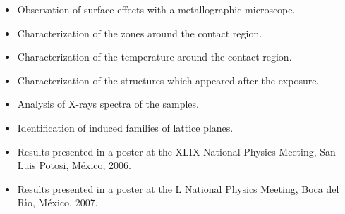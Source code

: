{\begin{itemize}
\begin{itemize}
    \item Observation of surface effects with a metallographic microscope.
    \item Characterization of the zones around the contact region.
    \item Characterization of the temperature around the contact region.
    \item Characterization of the structures which appeared after the exposure.
    \item Analysis of X-rays spectra of the samples.
    \item Identification of induced families of lattice planes.
    \item Results presented in a poster at the XLIX National Physics Meeting, San Luis Potosi, M\'{e}xico, 2006.
    \item Results presented in a poster at the L National Physics Meeting, Boca del R\'{\i}o, M\'{e}xico, 2007.
  \end{itemize}
\end{itemize}
}
%
